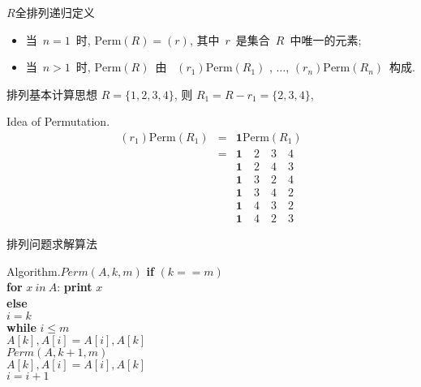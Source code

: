 \documentclass[fontset=fandol,UTF8,fleqn]{beamer}
\begin{document}
\begin{frame}{$R$全排列递归定义}
\begin{itemize}[<+-|alert@+>]
\item 当~$n=1$~时,  $\mathrm{Perm}(R)=(r)$,  其中~$r$~是集合~$R$~中唯一的元素; 
\item 当~$n>1$~时, $\mathrm{Perm}(R)$~由~ $(r_1)\mathrm{Perm}(R_1)$
 , $\ldots$, $(r_n)\mathrm{Perm}(R_n)$~构成. 
\end{itemize}
\end{frame}

\begin{frame}{排列基本计算思想}
  $R=\{1, 2, 3, 4\}$, 则 $R_1=R-r_1=\{2, 3, 4\}$,
  \begin{exampleblock}{Idea of Permutation.}
    \begin{eqnarray*}
  (r_1)\mathrm{Perm}(R_1) & = & \mathbf{1} \mathrm{Perm}(R_1)   \\
& = & \mathbf{1}\quad  2\quad 3 \quad 4\\ 
& & \mathbf{1}\quad  2\quad 4 \quad 3   \\ 
& & \mathbf{1}\quad  3\quad 2 \quad 4  \\ 
& & \mathbf{1}\quad  3\quad 4 \quad 2   \\
& & \mathbf{1}\quad  4\quad  {3 \quad 2}  \\
& & \mathbf{1}\quad  4\quad {2 \quad 3}  
\end{eqnarray*}
\end{exampleblock}
\end{frame}

\begin{frame}{排列问题求解算法}
  \begin{exampleblock}{Algorithm.$Perm(A, k, m)$}
\qquad    \textbf{if} $(k == m) $\\
 \qquad \qquad  \textbf{for} $x\ in\ A$:  \qquad \textbf{print} $x$\\
\qquad \textbf{else}\\
\qquad \qquad $i = k$\\
\qquad \qquad \textbf{while} $i \leq m$\\
\qquad \qquad \qquad $A[k], A[i] = A[i], A[k]$\\
\qquad \qquad \qquad $Perm(A, k+1, m)$\\
\qquad \qquad \qquad $ A[k], A[i] = A[i], A[k]$\\
\qquad \qquad \qquad $i = i + 1$
\end{exampleblock}
\end{frame}
\end{document}
